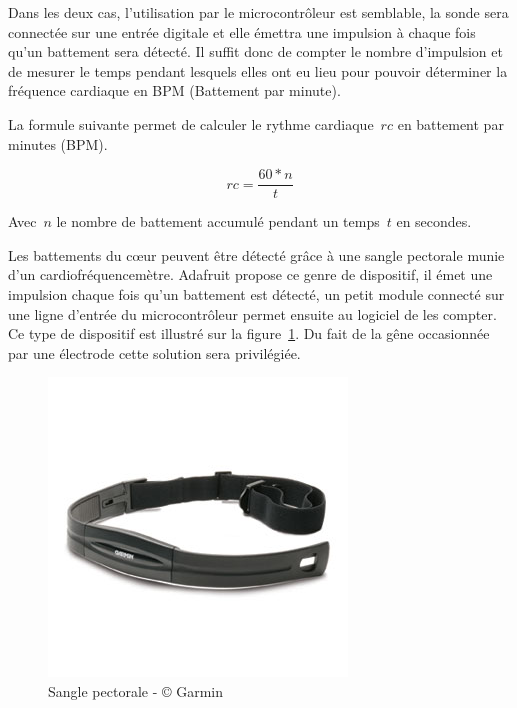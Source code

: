 Dans les deux cas, l’utilisation par le microcontrôleur est semblable, la sonde sera connectée sur une entrée digitale et elle émettra une impulsion à chaque fois qu’un battement sera détecté. Il suffit donc de compter le nombre d’impulsion et de mesurer le temps pendant lesquels elles ont eu lieu pour pouvoir déterminer la fréquence cardiaque en BPM (Battement par minute).

La formule suivante permet de calculer le rythme cardiaque~$rc$ en battement par minutes (BPM).

\begin{equation}\label{eqn:rythme_card}
rc = \frac{60 * n}{t}
\end{equation}

Avec~$n$ le nombre de battement accumulé pendant un temps~$t$ en secondes.

Les battements du cœur peuvent être détecté grâce à une sangle pectorale munie d’un cardiofréquencemètre. Adafruit propose ce genre de dispositif, il émet une impulsion chaque fois qu'un battement est détecté, un petit module connecté sur une ligne d'entrée du microcontrôleur permet ensuite au logiciel de les compter. Ce type de dispositif est illustré sur la figure~\ref{fig:cardiofreq}. Du fait de la gêne occasionnée par une électrode cette solution sera privilégiée.

\begin{figure}[htb]
\centering 
\includegraphics[width=0.6\columnwidth]{../images/garmin-heart-rate.jpg} 
\caption[Sangle Pectorale]{Sangle pectorale - © Garmin}
\label{fig:cardiofreq}
\end{figure}



